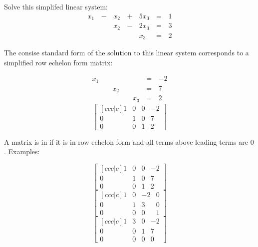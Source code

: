\begin{applicationActivities}{2}{4}
\begin{activity}{10}
  Solve this simplifed linear system:
    \begin{alignat*}{4}
       x_1 &\,-\,&  x_2  &\,+\,&  5x_3 &\,=\,& 1 \\
           &\, \,&  x_2 &\,-\,&  2x_3 &\,=\,& 3 \\
           &\, \,&      &\, \,&   x_3 &\,=\,& 2
    \end{alignat*}
\end{activity}

\begin{observation}
  The consise standard form of the solution to this linear system
  corresponds to a simplified row echelon form matrix:
  \begin{multicols}{2}\noindent
    \begin{alignat*}{4}
       x_1 &\, \,&      &\, \,&       &\,=\,& -2 \\
           &\, \,&  x_2 &\, \,&       &\,=\,& 7 \\
           &\, \,&      &\, \,&   x_3 &\,=\,& 2
    \end{alignat*}
    \[
      \begin{bmatrix}[ccc|c]
        1 & 0 & 0 & -2 \\
        0 & 1 & 0 & 7 \\
        0 & 0 & 1 & 2
      \end{bmatrix}
    \]
  \end{multicols}
\end{observation}

\begin{definition}
  A matrix is in  if it is in row echelon form
  and all terms above leading terms are \(0\). Examples:
  \begin{multicols}{3}\noindent
    \[
      \begin{bmatrix}[ccc|c]
        1 & 0 & 0 & -2 \\
        0 & 1 & 0 & 7 \\
        0 & 0 & 1 & 2
      \end{bmatrix}
    \]
    \[
      \begin{bmatrix}[ccc|c]
        1 & 0 & -2 & 0 \\
        0 & 1 & 3 & 0 \\
        0 & 0 & 0 & 1
      \end{bmatrix}
    \]
    \[
      \begin{bmatrix}[ccc|c]
        1 & 3 & 0 & -2 \\
        0 & 0 & 1 & 7 \\
        0 & 0 & 0 & 0
      \end{bmatrix}
    \]
  \end{multicols}
\end{definition}


\end{applicationActivities}
